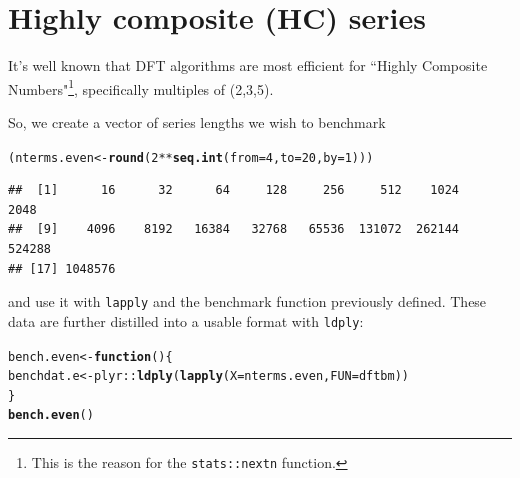 \documentclass[10pt]{article}\usepackage[]{graphicx}\usepackage[]{color}
\makeatletter
\newcommand{\hlnum}[1]{\textcolor[rgb]{0.686,0.059,0.569}{#1}}%
\newcommand{\hlopt}[1]{\textcolor[rgb]{0,0,0}{#1}}%
\newcommand{\hlstd}[1]{\textcolor[rgb]{0.345,0.345,0.345}{#1}}%
\newcommand{\hlkwa}[1]{\textcolor[rgb]{0.161,0.373,0.58}{\textbf{#1}}}%
\newcommand{\hlkwb}[1]{\textcolor[rgb]{0.69,0.353,0.396}{#1}}%
\newcommand{\hlkwc}[1]{\textcolor[rgb]{0.333,0.667,0.333}{#1}}%
\newcommand{\hlkwd}[1]{\textcolor[rgb]{0.737,0.353,0.396}{\textbf{#1}}}%
\newenvironment{kframe}{%
 \def\at@end@of@kframe{}%
 \ifinner\ifhmode%
  \def\at@end@of@kframe{\end{minipage}}%
  \begin{minipage}{\columnwidth}%
 \fi\fi%
 \def\FrameCommand##1{\hskip\@totalleftmargin \hskip-\fboxsep
 \colorbox{shadecolor}{##1}\hskip-\fboxsep
     \hskip-\linewidth \hskip-\@totalleftmargin \hskip\columnwidth}%
 \MakeFramed {\advance\hsize-\width
   \@totalleftmargin\z@ \linewidth\hsize
   \@setminipage}}%
 {\par\unskip\endMakeFramed%
 \at@end@of@kframe}
\newenvironment{knitrout}{}{} %
\newcommand{\Rcmd}[1]{\texttt{#1}}
\makeatother
\begin{document}
\section{Highly composite (HC) series}
It's well known that DFT algorithms are most efficient
for ``Highly Composite Numbers"\footnote{
This is the reason for the \Rcmd{stats::nextn} function.
}, specifically multiples of (2,3,5).

So, we create a vector of series lengths we wish to benchmark
\begin{knitrout}
\color{fgcolor}\begin{kframe}
\begin{alltt}
\hlstd{(nterms.even} \hlkwb{<-} \hlkwd{round}\hlstd{(}\hlnum{2}\hlopt{**}\hlkwd{seq.int}\hlstd{(}\hlkwc{from}\hlstd{=}\hlnum{4}\hlstd{,}\hlkwc{to}\hlstd{=}\hlnum{20}\hlstd{,}\hlkwc{by}\hlstd{=}\hlnum{1}\hlstd{)))}
\end{alltt}
\begin{verbatim}
##  [1]      16      32      64     128     256     512    1024    2048
##  [9]    4096    8192   16384   32768   65536  131072  262144  524288
## [17] 1048576
\end{verbatim}
\end{kframe}
\end{knitrout}
and use it with \Rcmd{lapply} and the benchmark function
previously defined.
These data are further distilled into a usable format
with \Rcmd{ldply}:
\begin{knitrout}
\color{fgcolor}\begin{kframe}
\begin{alltt}
\hlstd{bench.even} \hlkwb{<-} \hlkwa{function}\hlstd{()\{}
  \hlstd{benchdat.e} \hlkwb{<-} \hlstd{plyr}\hlopt{::}\hlkwd{ldply}\hlstd{(}\hlkwd{lapply}\hlstd{(}\hlkwc{X}\hlstd{=nterms.even,} \hlkwc{FUN}\hlstd{=dftbm))}
  \hlstd{\}}
\hlkwd{bench.even}\hlstd{()}
\end{alltt}
\end{kframe}
\end{knitrout}
\end{document}
